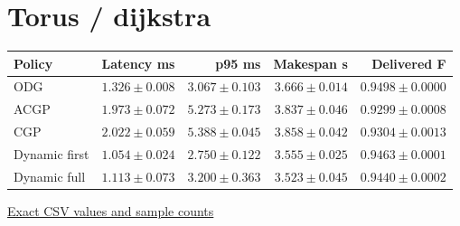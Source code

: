 \section*{Torus / dijkstra}
\begin{center}{\scriptsize\setlength{\tabcolsep}{3pt}
\begin{tabular}{lrrrr}
\toprule
Policy & Latency ms & p95 ms & Makespan s & Delivered F \\
\midrule
ODG & $1.326\pm0.008$ & $3.067\pm0.103$ & $3.666\pm0.014$ & $0.9498\pm0.0000$ \\
ACGP & $1.973\pm0.072$ & $5.273\pm0.173$ & $3.837\pm0.046$ & $0.9299\pm0.0008$ \\
CGP & $2.022\pm0.059$ & $5.388\pm0.045$ & $3.858\pm0.042$ & $0.9304\pm0.0013$ \\
Dynamic first & $1.054\pm0.024$ & $2.750\pm0.122$ & $3.555\pm0.025$ & $0.9463\pm0.0001$ \\
Dynamic full & $1.113\pm0.073$ & $3.200\pm0.363$ & $3.523\pm0.045$ & $0.9440\pm0.0002$ \\
\bottomrule\end{tabular}}
{\footnotesize\href{https://github.com/sanjeevkrishnaa/Compiler-Driven-ACE/blob/codex/ace-scheduler-correctness/docs/latex/qft96_final/data/matched_m4_c3.csv}{Exact CSV values and sample counts}}
\end{center}